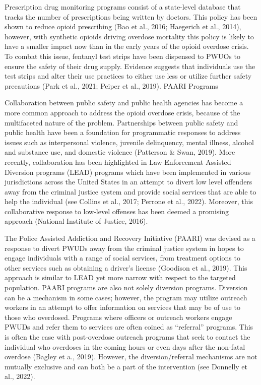 Prescription drug monitoring programs consist of a state-level database that tracks the number of prescriptions being written by doctors. This policy has been shown to reduce opioid prescribing (Bao et al., 2016; Haegerich et al., 2014), however, with synthetic opioids driving overdose mortality this policy is likely to have a smaller impact now than in the early years of the opioid overdose crisis. To combat this issue, fentanyl test strips have been dispensed to PWUOs to ensure the safety of their drug supply. Evidence suggests that individuals use the test strips and alter their use practices to either use less or utilize further safety precautions (Park et al., 2021; Peiper et al., 2019).
PAARI Programs 

Collaboration between public safety and public health agencies has become a more common approach to address the opioid overdose crisis, because of the multifaceted nature of the problem. Partnerships between public safety and public health have been a foundation for programmatic responses to address issues such as interpersonal violence, juvenile delinquency, mental illness, alcohol and substance use, and domestic violence (Patterson & Swan, 2019). More recently, collaboration has been highlighted in Law Enforcement Assisted Diversion programs (LEAD) programs which have been implemented in various jurisdictions across the United States in an attempt to divert low level offenders away from the criminal justice system and provide social services that are able to help the individual (see Collins et al., 2017; Perrone et al., 2022). Moreover, this collaborative response to low-level offenses has been deemed a promising approach (National Institute of Justice, 2016).

The Police Assisted Addiction and Recovery Initiative (PAARI) was devised as a response to divert PWUDs away from the criminal justice system in hopes to engage individuals with a range of social services, from treatment options to other services such as obtaining a driver’s license (Goodison et al., 2019). This approach is similar to LEAD yet more narrow with respect to the targeted population. PAARI programs are also not solely diversion programs. Diversion can be a mechanism in some cases; however, the program may utilize outreach workers in an attempt to offer information on services that may be of use to those who overdosed. Programs where officers or outreach workers engage PWUDs and refer them to services are often coined as “referral” programs. This is often the case with post-overdose outreach programs that seek to contact the individual who overdoses in the coming hours or even days after the non-fatal overdose (Bagley et a., 2019). However, the diversion/referral mechanisms are not mutually exclusive and can both be a part of the intervention (see Donnelly et al., 2022).

